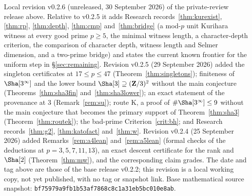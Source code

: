 \par\noindent\small Local revision v0.2.6 (unreleased, 30 September 2026) of the private-review release above. Relative to v0.2.5 it adds Research records~\ref{thm:kurexist}, \ref{thm:rp}, \ref{thm:depth}, \ref{thm:cmp} and~\ref{thm:bridge} (a mod-$p$ unit Kurihara witness at every good prime $p\ge5$, the minimal witness length, a character-depth criterion, the comparison of character depth, witness length and Selmer dimension, and a two-prime bridge) and states the current known frontier for the uniform step in \S\ref{sec:remaining}. Revision v0.2.5 (29 September 2026) added the singleton certificates at $17\le p\le47$ (Theorem~\ref{thm:singletons}); finiteness of $\Sha[3^\infty]$ and the lower bound $\Sha[3]\supseteq(\Z/3)^2$ without the main conjecture (Theorems~\ref{thm:sha3fin} and~\ref{thm:sha3lower}); an exact statement of the provenance at $3$ (Remark~\ref{rem:su}); route K, a proof of $\#\Sha[3^\infty]\le9$ without the main conjecture that becomes the primary support of Theorem~\ref{thm:sha3} (Theorem~\ref{thm:routek}); the bad-prime Criterion~\ref{crit:bh}; and Research records~\ref{thm:g2}, \ref{thm:katofact} and~\ref{thm:w}. Revision v0.2.4 (25 September 2026) added Remarks~\ref{rem:a4lean} and~\ref{rem:a5lean} (formal checks of the deductions at $p=3,5,7,11,13$), an exact descent certificate for the rank and $\Sha[2]$ (Theorem~\ref{thm:mw}), and the corresponding claim grades. The date and tag above are those of the base release v0.2.2; this revision is a local working copy, not yet published, with no tag or snapshot link. Base mathematical source snapshot: \nolinkurl{bf75979a9fb1b53af7868c8c1a31eb5bc010e8ab}.\normalsize
